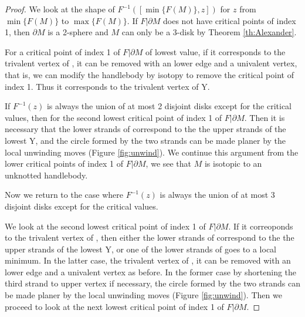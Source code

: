 \documentclass{amsart}
\numberwithin{equation}{section}
\newcommand{\bd}{\partial}
\begin{document}
\begin{proof}
We look at the shape of $F^{-1}([\min\{F(M)\},z])$  for $z$ from $\min\{F(M)\}$ to $\max\{F(M)\}$. If $F|\bd M$ does not have critical points of index 1, then 
$\bd M$ is a 2-sphere and 
$M$ can only be a 3-disk by Theorem \ref{th:Alexander}. 

For a critical point of index 1 of $F|\bd M$ of lowest value, if it corresponds to the trivalent vertex of , it can be removed with an lower edge and a univalent vertex, that is, we can modify the handlebody by isotopy to remove the critical point of index 1. Thus it corresponds to the trivalent vertex of Y. 

If $F^{-1}(z)$ is always the union of at most 2 disjoint disks except for the critical values, then for the second lowest critical point of index 1 of $F|\bd M$. Then it is necessary that the lower strands of  correspond to the the upper strands of the lowest Y,
and the circle formed by the two strands can be made planer by the local unwinding moves (Figure \ref{fig:unwind}). We continue this argument from the lower critical points of index 1 of $F|\bd M$, we see that  $M$ is isotopic to an unknotted handlebody.

Now we return to the case where $F^{-1}(z)$ is always the union of at most 3 disjoint disks except for the critical values. 

We look at the second lowest critical point of index 1 of $F|\bd M$.
If it correoponds to the trivalent vertex of , then either the lower strands of  correspond to the the upper strands of the lowest Y, or one of the lower strands of  goes to a local minimum. In the latter case, the trivalent vertex of , it can be removed with an lower edge and a univalent vertex as before. In the former case by shortening the third strand to upper vertex if necessary, the circle formed by the two strands can be made planer by the local unwinding moves (Figure \ref{fig:unwind}). Then we proceed to look at the next lowest critical point of index 1 of $F|\bd M$.


\end{proof}
\end{document}
